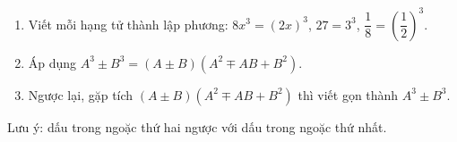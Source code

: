 \begin{enumerate}
\item Viết mỗi hạng tử thành lập phương: $8x^3=(2x)^3$, $27=3^3$, $\dfrac18=\left(\dfrac12\right)^3$.
\item Áp dụng $A^3\pm B^3=(A\pm B)\left(A^2\mp AB+B^2\right)$.
\item Ngược lại, gặp tích $(A\pm B)(A^2\mp AB+B^2)$ thì viết gọn thành $A^3\pm B^3$.
\end{enumerate}
Lưu ý: dấu trong ngoặc thứ hai ngược với dấu trong ngoặc thứ nhất.
